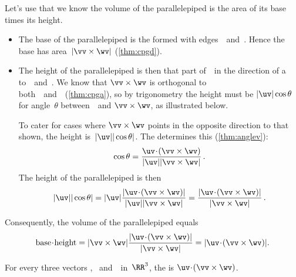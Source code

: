 %
Let's use that we know the volume of the parallelepiped is the area of its base times its height.
\begin{itemize}
\item The base of the parallelepiped is the  formed with edges~\vv\ and~\wv.
Hence the base has area~\(|\vv\times\wv|\) (\cref{thm:cpgd}).

\item The height of the parallelepiped is then that part of~\uv\ in the direction of a  to~\vv\ and~\wv.
We know that \(\vv\times\wv\) is orthogonal to both~\vv\ and~\wv\ (\cref{thm:cpga}), so by trigonometry the height must be \(|\uv|\cos\theta\) for angle~\(\theta\) between~\uv\ and \(\vv\times\wv\), as illustrated below.
\begin{center}
\end{center}
To cater for cases where \(\vv\times\wv\) points in the opposite direction to that shown, the height is~\(|\uv||\cos\theta|\).
The   determines this  (\cref{thm:anglev}):
\begin{equation*}
\cos\theta=\frac{\uv\cdot(\vv\times\wv)}{|\uv||\vv\times\wv|}\,.
\end{equation*}
The height of the parallelepiped is then
\begin{equation*}
|\uv||\cos\theta|=|\uv|\frac{|\uv\cdot(\vv\times\wv)|}{|\uv||\vv\times\wv|}
=\frac{|\uv\cdot(\vv\times\wv)|}{|\vv\times\wv|}\,.
\end{equation*}
\end{itemize}
Consequently, the volume of the parallelepiped equals
\begin{equation*}
\text{base}\cdot\text{height}
=|\vv\times\wv|\frac{|\uv\cdot(\vv\times\wv)|}{|\vv\times\wv|}
=|\uv\cdot(\vv\times\wv)|.
\end{equation*}



\begin{definition} \label{def:sctrpr}
For every three vectors \uv, \vv\ and~\wv\ in~\(\RR^3\), the  is \(\uv\cdot(\vv\times\wv)\).
\end{definition}




